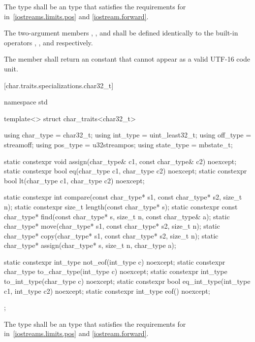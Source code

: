 \pnum
The type
shall be an  type that satisfies the requirements
for  in~\ref{iostreams.limits.pos} and \ref{iostream.forward}.

\pnum
The two-argument members ,
, and  shall be defined identically to
the built-in operators \tcode{=}, \tcode{==}, and
\tcode{<} respectively.

\pnum
The member  shall return an
 constant that cannot appear
as a valid UTF-16 code unit.

[char.traits.specializations.char32_t]{}

%
\begin{codeblock}
namespace std {
  template<> struct char_traits<char32_t> {
    using char_type  = char32_t;
    using int_type   = uint_least32_t;
    using off_type   = streamoff;
    using pos_type   = u32streampos;
    using state_type = mbstate_t;

    static constexpr void assign(char_type& c1, const char_type& c2) noexcept;
    static constexpr bool eq(char_type c1, char_type c2) noexcept;
    static constexpr bool lt(char_type c1, char_type c2) noexcept;

    static constexpr int compare(const char_type* s1, const char_type* s2, size_t n);
    static constexpr size_t length(const char_type* s);
    static constexpr const char_type* find(const char_type* s, size_t n,
                                           const char_type& a);
    static char_type* move(char_type* s1, const char_type* s2, size_t n);
    static char_type* copy(char_type* s1, const char_type* s2, size_t n);
    static char_type* assign(char_type* s, size_t n, char_type a);

    static constexpr int_type not_eof(int_type c) noexcept;
    static constexpr char_type to_char_type(int_type c) noexcept;
    static constexpr int_type to_int_type(char_type c) noexcept;
    static constexpr bool eq_int_type(int_type c1, int_type c2) noexcept;
    static constexpr int_type eof() noexcept;
  };
}
\end{codeblock}

\pnum
The type
shall be an  type that satisfies the requirements
for  in~\ref{iostreams.limits.pos} and \ref{iostream.forward}.

